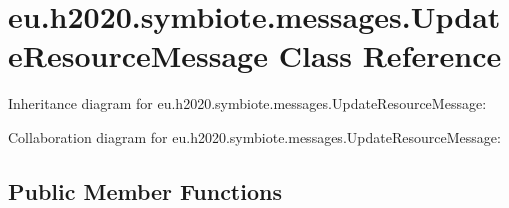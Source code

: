 \hypertarget{classeu_1_1h2020_1_1symbiote_1_1messages_1_1UpdateResourceMessage}{}\section{eu.\+h2020.\+symbiote.\+messages.\+Update\+Resource\+Message Class Reference}
\label{classeu_1_1h2020_1_1symbiote_1_1messages_1_1UpdateResourceMessage}


Inheritance diagram for eu.\+h2020.\+symbiote.\+messages.\+Update\+Resource\+Message\+:


Collaboration diagram for eu.\+h2020.\+symbiote.\+messages.\+Update\+Resource\+Message\+:
\subsection*{Public Member Functions}
